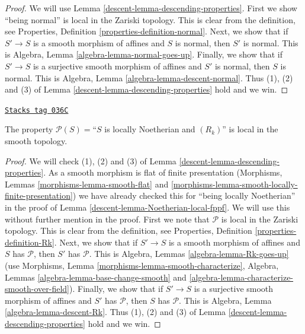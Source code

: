\begin{proof}

We will use Lemma \ref{descent-lemma-descending-properties}.
First we show ``being normal'' is local
in the Zariski topology. This is clear from the definition,
see Properties, Definition \ref{properties-definition-normal}.
Next, we show that if $S' \to S$ is a smooth morphism of affines
and $S$ is normal, then $S'$ is normal. This is
Algebra, Lemma \ref{algebra-lemma-normal-goes-up}.
Finally, we show that if $S' \to S$ is a surjective
smooth morphism of affines
and $S'$ is normal, then $S$ is normal. This is
Algebra, Lemma \ref{algebra-lemma-descent-normal}.
Thus (1), (2) and (3) of Lemma \ref{descent-lemma-descending-properties} hold
and we win.
\end{proof}

\begin{lemma}
\label{descent-lemma-Rk-local-smooth}
\href{https://stacks.math.columbia.edu/tag/036C}{\texttt{Stacks tag 036C}}

The property $\mathcal{P}(S) =$``$S$ is locally Noetherian and $(R_k)$''
is local in the smooth topology.
\end{lemma}

\begin{proof}

We will check (1), (2) and (3) of Lemma \ref{descent-lemma-descending-properties}.
As a smooth morphism is flat of finite presentation
(Morphisms, Lemmas \ref{morphisms-lemma-smooth-flat}
and \ref{morphisms-lemma-smooth-locally-finite-presentation})
we have already checked this for ``being locally Noetherian'' in the proof
of Lemma \ref{descent-lemma-Noetherian-local-fppf}.
We will use this without further mention in the proof.
First we note that $\mathcal{P}$ is local in the Zariski topology.
This is clear from the definition,
see Properties, Definition \ref{properties-definition-Rk}.
Next, we show that if $S' \to S$ is a smooth morphism of affines
and $S$ has $\mathcal{P}$, then $S'$ has $\mathcal{P}$. This
is Algebra, Lemmas \ref{algebra-lemma-Rk-goes-up}
(use Morphisms, Lemma \ref{morphisms-lemma-smooth-characterize},
Algebra, Lemmas \ref{algebra-lemma-base-change-smooth}
and \ref{algebra-lemma-characterize-smooth-over-field}).
Finally, we show that if $S' \to S$ is a surjective
smooth morphism of affines and $S'$ has $\mathcal{P}$,
then $S$ has $\mathcal{P}$. This is
Algebra, Lemma \ref{algebra-lemma-descent-Rk}.
Thus (1), (2) and (3) of Lemma \ref{descent-lemma-descending-properties} hold
and we win.
\end{proof}

